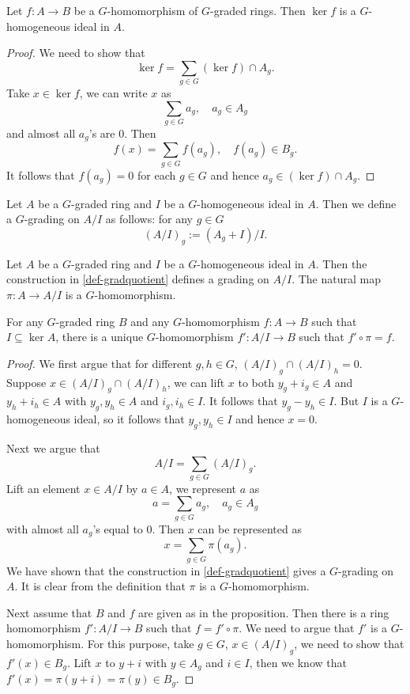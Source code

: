 \begin{lemma}\label{lma-kernelghomogeneous}
    Let $f:A\rightarrow B$ be a $G$-homomorphism of $G$-graded rings. Then $\ker f$ is a $G$-homogeneous ideal in $A$.
\end{lemma}
\begin{proof}
    We need to show that
    \[
        \ker f=\sum_{g\in G} (\ker f)\cap A_g.  
    \]
    Take $x\in \ker f$, we can write $x$ as 
    \[
        \sum_{g\in G} a_g,\quad a_g\in A_g
    \]
    and almost all $a_g$'s are $0$. Then 
    \[
        f(x)=  \sum_{g\in G} f(a_g),\quad f(a_g)\in B_g.
    \]
    It follows that $f(a_g)=0$ for each $g\in G$ and hence $a_g\in (\ker f)\cap A_g$.
\end{proof}

\begin{definition}\label{def-gradquotient}
    Let $A$ be a $G$-graded ring and $I$ be a $G$-homogeneous ideal in $A$. Then we define a $G$-grading on $A/I$ as follows: for any $g\in G$
    \[
        (A/I)_g:= (A_g+I)/I.
    \]
\end{definition}
\begin{proposition}
    Let $A$ be a $G$-graded ring and $I$ be a $G$-homogeneous ideal in $A$. Then the construction in \cref{def-gradquotient} defines a grading on $A/I$. The natural map $\pi:A\rightarrow A/I$ is a $G$-homomorphism.

    For any $G$-graded ring $B$ and any $G$-homomorphism $f:A\rightarrow B$ such that $I\subseteq \ker A$, there is a unique $G$-homomorphism $f':A/I\rightarrow B$ such that $f'\circ \pi=f$.
\end{proposition} 
\begin{proof}
    We first argue that for different $g,h\in G$, $(A/I)_g\cap (A/I)_h=0$. Suppose $x\in (A/I)_g\cap (A/I)_h$, we can lift $x$ to both $y_g+i_g\in A$ and $y_h+i_h\in A$ with $y_g,y_h\in A$ and $i_g,i_h\in I$. It follows that $y_g-y_h\in I$. But $I$ is a $G$-homogeneous ideal, so it follows that $y_g,y_h\in I$ and hence $x=0$.

    Next we argue that
    \[
        A/I=\sum_{g\in G}  (A/I)_g.
    \]
    Lift an element $x\in A/I$ by $a\in A$, we represent $a$ as
    \[
        a=\sum_{g\in G} a_g,\quad a_g\in A_g 
    \]
    with almost all $a_g$'s equal to $0$. Then $x$ can be represented as
    \[
        x=\sum_{g\in G}\pi(a_g).  
    \]
    We have shown that the construction in \cref{def-gradquotient} gives a $G$-grading on $A$. It is clear from the definition that $\pi$ is a $G$-homomorphism.

    Next assume that $B$ and $f$ are given as in the proposition. Then there is a ring homomorphism $f':A/I\rightarrow B$ such that $f=f'\circ \pi$. We need to argue that $f'$ is a $G$-homomorphism. For this purpose, take $g\in G$, $x\in (A/I)_g$, we need to show that $f'(x)\in B_g$. Lift $x$ to $y+i$ with $y\in A_g$ and $i\in I$, then we know that $f'(x)=\pi(y+i)=\pi(y)\in B_g$.    
\end{proof}

